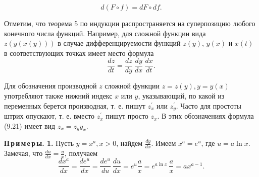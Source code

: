 \documentclass[a4paper,12pt]{article}
\begin{document}
$$ d(F\circ f) = dF \circ df. $$
\par Отметим, что теорема 5 по индукции распространяется на суперпозицию любого конечного числа функций. Например, для сложной функции вида $z(y(x(y)))$ в случае дифференцируемости функций $z(y)$, $y(x)$ и $x(t)$ в соответствующих точках имеет место формула
$$ \frac{dz}{dt} = \frac{dz}{dy}\:\frac{dy}{dx}\:\frac{dx}{dt}. $$
\par Для обозначения производной $z$ сложной функции $z = z(y), y = y(x)$ употребляют также нижний индекс $x$ или $y$, указывающий, по какой из переменных берется производная, т. е. пишут $z^\prime_{x}$ или $z^\prime_{y}$. Часто для простоты штрих опускают, т. е. вместо $z^\prime_{x}$ пишут просто  $z_{x}$. В этих обозначениях формула (9.21) имеет вид $z_{x} = z_{y}y_{x}$.
\par {\sffamily \textbf{{П\,р\,и\,м\,е\,р\,ы. 1.}}} Пусть $y = x^a, x > 0$, найдем $\frac{dy}{dx}$. Имеем  $x^a = e^u$, где $u = a\ln{x}$. Замечая, что $\frac{du}{dx} = \frac{u}{x}$, получаем
$$ \frac{dx^a}{dx} = \frac{de^u}{dx} = \frac{de^u}{du}\:\frac{du}{dx} = e^u \frac{a}{x} = e^{a\ln{x}}\,\frac{a}{x} = ax^{a - 1}.$$
\end{document}
